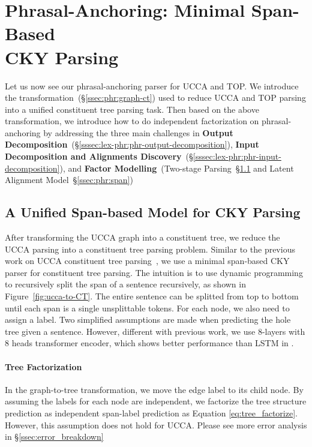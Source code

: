 \section[Phrasal-Anchoring: Minimal Span-based CKY Parsing]{Phrasal-Anchoring: Minimal Span-Based \\CKY Parsing}
\label{sec:lex-phr:cky-based}

Let us now see our phrasal-anchoring parser for UCCA and TOP. We
introduce the transformation~(\S\ref{ssec:phr:graph-ct}) used to reduce
UCCA and TOP parsing into a unified constituent tree parsing task. Then
based on the above transformation, we introduce how to do independent
factorization on phrasal-anchoring by addressing the three main
challenges in \textbf{Output
  Decomposition}~(\S\ref{sssec:lex-phr:phr-output-decomposition}),
\textbf{Input Decomposition and Alignments
  Discovery}~(\S\ref{sssec:lex-phr:phr-input-decomposition}), and
\textbf{Factor Modelling}~(Two-stage
Parsing~\S\ref{ssec:phr:cky} and Latent Alignment
Model~\S\ref{ssec:phr:span})





\subsection{A Unified Span-based Model for CKY Parsing}
\label{ssec:phr:cky}
After transforming the UCCA graph into a constituent tree, we reduce
the UCCA parsing into a constituent tree parsing problem. Similar to
the previous work on UCCA constituent tree
parsing~\cite{jiang2019hlt}, we use a minimal span-based CKY parser
for constituent tree parsing.  The intuition is to use dynamic
programming to recursively split the span of a sentence recursively,
as shown in Figure~\ref{fig:ucca-to-CT}. The entire sentence can be
splitted from top to bottom until each span is a single unsplittable
tokens. For each node, we also need to assign a label. Two simplified
assumptions are made when predicting the hole tree given a
sentence. However, different with previous work, we use 8-layers with
8 heads transformer encoder, which shows better performance than LSTM
in \citet{kitaev2018constituency}.

\paragraph{Tree Factorization} In the graph-to-tree transformation, we
move the edge label to its child node. By assuming the labels for each
node are independent, we factorize the tree structure prediction as
independent span-label prediction as Equation
\ref{eq:tree_factorize}. However, this assumption does not hold for UCCA.
Please see more error analysis in \S \ref{ssec:error_breakdown}

